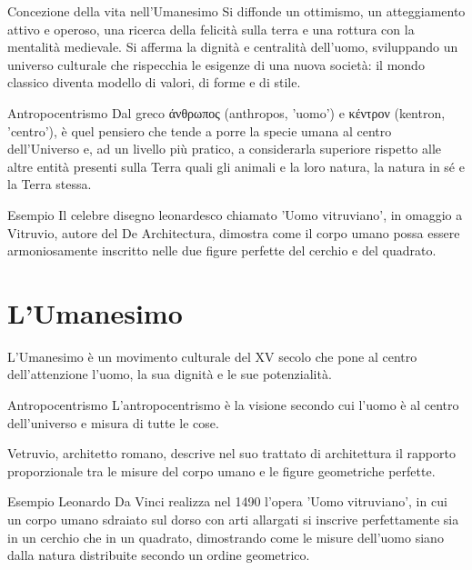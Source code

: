 \documentclass[12pt]{article}
\begin{document}
\begin{defn}{Concezione della vita nell'Umanesimo}
Si diffonde un ottimismo, un atteggiamento attivo e operoso, una ricerca della felicità sulla terra e una rottura con la mentalità medievale. Si afferma la dignità e centralità dell'uomo, sviluppando un universo culturale che rispecchia le esigenze di una nuova società: il mondo classico diventa modello di valori, di forme e di stile.
\end{defn}


\begin{defn}{Antropocentrismo}
Dal greco άνθρωπος (anthropos, 'uomo') e κέντρον (kentron, 'centro'), è quel pensiero che tende a porre la specie umana al centro dell'Universo e, ad un livello più pratico, a considerarla superiore rispetto alle altre entità presenti sulla Terra quali gli animali e la loro natura, la natura in sé e la Terra stessa.
\end{defn}


\begin{ex}{Esempio}
Il celebre disegno leonardesco chiamato 'Uomo vitruviano', in omaggio a Vitruvio, autore del De Architectura, dimostra come il corpo umano possa essere armoniosamente inscritto nelle due figure perfette del cerchio e del quadrato.
\end{ex}


\section{L'Umanesimo}


L'Umanesimo è un movimento culturale del XV secolo che pone al centro dell'attenzione l'uomo, la sua dignità e le sue potenzialità.


\begin{defn}{Antropocentrismo}
L'antropocentrismo è la visione secondo cui l'uomo è al centro dell'universo e misura di tutte le cose.
\end{defn}


Vetruvio, architetto romano, descrive nel suo trattato di architettura il rapporto proporzionale tra le misure del corpo umano e le figure geometriche perfette.


\begin{ex}{Esempio}
Leonardo Da Vinci realizza nel 1490 l'opera 'Uomo vitruviano', in cui un corpo umano sdraiato sul dorso con arti allargati si inscrive perfettamente sia in un cerchio che in un quadrato, dimostrando come le misure dell'uomo siano dalla natura distribuite secondo un ordine geometrico.
\end{ex}
\end{document}
